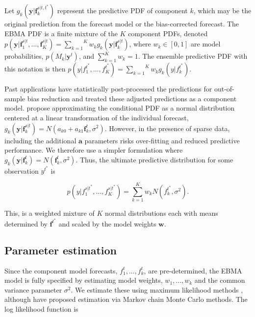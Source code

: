 \documentclass[12pt,fullpage,endnotes]{article}
\begin{document}
Let $g_k(\mathbf{y}|\mathbf{f}_k^{s|t, t^\ast})$ represent the
predictive PDF of component $k$, which may be the original prediction
from the forecast model or the bias-corrected forecast.  The EBMA PDF
is a finite mixture of the $K$ component PDFs, denoted
$p(\mathbf{y}|\mathbf{f}_1^{s|t}, \ldots,
\mathbf{f}_K^{s|t})=\overset{K}{\underset{k=1}{\sum}} w_k
g_k(\mathbf{y}|\mathbf{f}_k^{s|t})$, where $w_k \in [0,1]$ are model
probabilities, $p(M_k|\mathbf{y}^t)$, and $\sum_{k=1}^Kw_k=1$. The
ensemble predictive PDF with this notation is then
$p(y|f_{1}^{t^\ast}, \ldots,
f_{K}^{t^\ast})=\overset{K}{\underset{k=1}{\sum}} w_k
g_k(y|f_{k}^{t^*})$.

Past applications have statistically post-processed the predictions for
out-of-sample bias reduction and treated these adjusted predictions as a
component model. \citet{Raftery:2005} propose approximating the
conditional PDF as a normal distribution centered at a linear
transformation of the individual forecast,
$g_k(\mathbf{y}|\mathbf{f}_k^{s|t}) = N(a_{k0} +
a_{k1}\mathbf{f}_k^{t}, \sigma^2)$. However, in the presence of sparse
data, including the additional $\mathbf{a}$ parameters risks
over-fitting and reduced predictive performance.  We therefore use a
simpler formulation where $g_k(\mathbf{y}|\mathbf{f}_k^{t}) =
N(\mathbf{f}_k^{t}, \sigma^2)$.  Thus, the ultimate predictive
distribution for some observation $y^{t^\ast}$ is 

\begin{equation}
\label{pdf}p(y|f_1^{s|t^\ast},
\ldots, f_K^{s|t^\ast}) = \overset{K}{\underset{k=1}{\sum}} w_k
N(f_k^{t^\ast}, \sigma^2).
\end{equation}

\noindent This, is a weighted mixture of $K$ normal distributions each with 
means  determined by $\mathbf{f}^{t^\ast}$ and scaled by the
model weights $\mathbf{w}$.

\subsection{Parameter estimation}

Since the component model forecasts, $f^t_1, \ldots, f^t_k$, are
pre-determined, the EBMA model is fully specified by estimating model
weights, $w_1, \ldots, w_k$ and the common variance parameter
$\sigma^2$.  We estimate these using maximum likelihood methods
\citep{Raftery:2005}, although \citet{Vrugt:2008} have proposed
estimation via Markov chain Monte Carlo methods.  The log likelihood
function is
\end{document}
